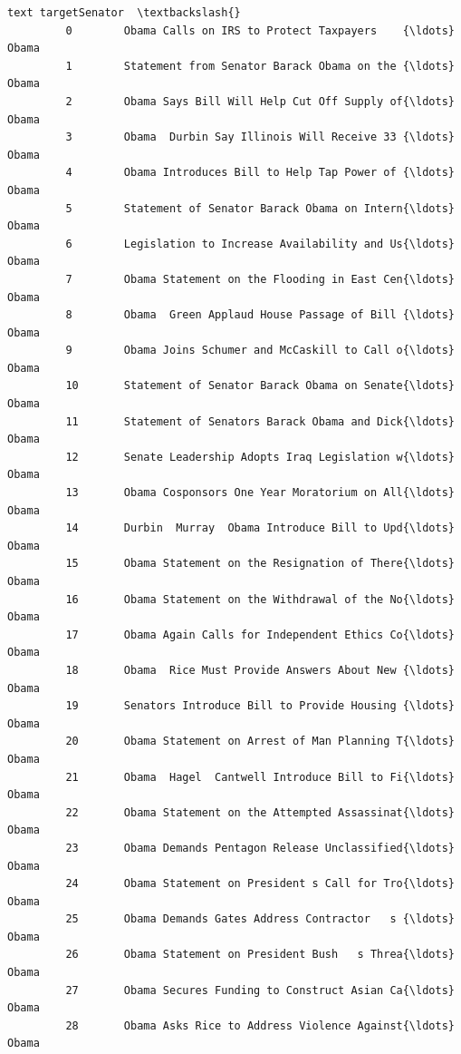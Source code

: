 \documentclass[11pt]{article}
\begin{document}
\begin{Verbatim}[commandchars=\\\{\}]
                                                            text targetSenator  \textbackslash{}
         0        Obama Calls on IRS to Protect Taxpayers    {\ldots}         Obama   
         1        Statement from Senator Barack Obama on the {\ldots}         Obama   
         2        Obama Says Bill Will Help Cut Off Supply of{\ldots}         Obama   
         3        Obama  Durbin Say Illinois Will Receive 33 {\ldots}         Obama   
         4        Obama Introduces Bill to Help Tap Power of {\ldots}         Obama   
         5        Statement of Senator Barack Obama on Intern{\ldots}         Obama   
         6        Legislation to Increase Availability and Us{\ldots}         Obama   
         7        Obama Statement on the Flooding in East Cen{\ldots}         Obama   
         8        Obama  Green Applaud House Passage of Bill {\ldots}         Obama   
         9        Obama Joins Schumer and McCaskill to Call o{\ldots}         Obama   
         10       Statement of Senator Barack Obama on Senate{\ldots}         Obama   
         11       Statement of Senators Barack Obama and Dick{\ldots}         Obama   
         12       Senate Leadership Adopts Iraq Legislation w{\ldots}         Obama   
         13       Obama Cosponsors One Year Moratorium on All{\ldots}         Obama   
         14       Durbin  Murray  Obama Introduce Bill to Upd{\ldots}         Obama   
         15       Obama Statement on the Resignation of There{\ldots}         Obama   
         16       Obama Statement on the Withdrawal of the No{\ldots}         Obama   
         17       Obama Again Calls for Independent Ethics Co{\ldots}         Obama   
         18       Obama  Rice Must Provide Answers About New {\ldots}         Obama   
         19       Senators Introduce Bill to Provide Housing {\ldots}         Obama   
         20       Obama Statement on Arrest of Man Planning T{\ldots}         Obama   
         21       Obama  Hagel  Cantwell Introduce Bill to Fi{\ldots}         Obama   
         22       Obama Statement on the Attempted Assassinat{\ldots}         Obama   
         23       Obama Demands Pentagon Release Unclassified{\ldots}         Obama   
         24       Obama Statement on President s Call for Tro{\ldots}         Obama   
         25       Obama Demands Gates Address Contractor   s {\ldots}         Obama   
         26       Obama Statement on President Bush   s Threa{\ldots}         Obama   
         27       Obama Secures Funding to Construct Asian Ca{\ldots}         Obama   
         28       Obama Asks Rice to Address Violence Against{\ldots}         Obama   

\end{Verbatim}
\end{document}
